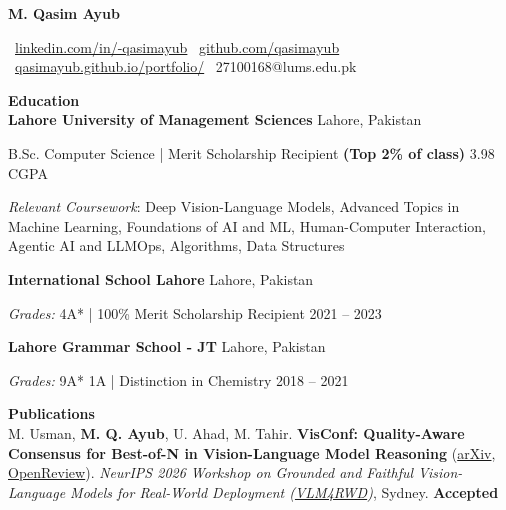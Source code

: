 \documentclass[11pt]{article}
\begin{document}
\begin{center}
    \textbf{M. Qasim Ayub}\\
    \hrulefill
\end{center}

\begin{center}
    \textbullet \ \href{https://www.linkedin.com/in/-qasimayub}{linkedin.com/in/-qasimayub}
    \textbullet \ \href{https://github.com/qasimayub}{github.com/qasimayub}
    \textbullet \ \href{https://qasimayub.github.io/portfolio/}{qasimayub.github.io/portfolio/}
    \textbullet \ 27100168@lums.edu.pk
\end{center}

\vspace{0.3cm}
{\large \textbf{Education}}
\vspace{0.15cm}\\
\textbf{Lahore University of Management Sciences} \hfill Lahore, Pakistan

B.Sc. Computer Science | Merit Scholarship Recipient \textbf{(Top 2\% of class)} \hfill 3.98 CGPA

\emph{Relevant Coursework}: Deep Vision-Language Models, Advanced Topics in Machine Learning, Foundations of AI and ML, Human-Computer Interaction, Agentic AI and LLMOps, Algorithms, Data Structures

\textbf{International School Lahore} \hfill	Lahore, Pakistan

\emph{Grades:} 4A* | 100\% Merit Scholarship Recipient \hfill 2021 – 2023

\textbf{Lahore Grammar School - JT} \hfill	Lahore, Pakistan

\emph{Grades:} 9A* 1A | Distinction in Chemistry \hfill 2018 – 2021

\vspace{0.3cm}
{\large \textbf{Publications}}
\vspace{0.15cm}\\
M. Usman, \textbf{M. Q. Ayub}, U. Ahad, M. Tahir. \textbf{VisConf: Quality-Aware Consensus for Best-of-N in Vision-Language Model Reasoning} (\href{https://arxiv.org/abs/2610.24526}{arXiv}, \href{https://openreview.net/forum?id=FdvdQ3Rw8P}{OpenReview}). \emph{NeurIPS 2026 Workshop on Grounded and Faithful Vision-Language Models for Real-World Deployment (\href{https://vlm4rwd.github.io/}{VLM4RWD})}, Sydney. \hfill \textbf{Accepted}
\end{document}
